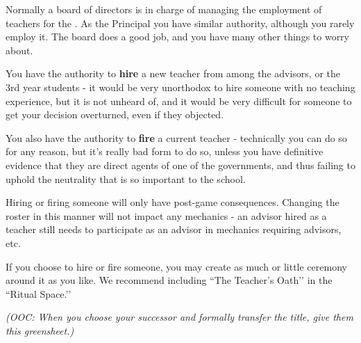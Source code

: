 \documentclass[green]{GL2020}
\begin{document}
\name{\gHireTeacher{}}

Normally a board of directors is in charge of managing the employment of teachers for the \pSchool{}. As the Principal you have similar authority, although you rarely employ it. The board does a good job, and you have many other things to worry about.

You have the authority to \textbf{hire} a new teacher from among the advisors, or the 3rd year students - it would be very unorthodox to hire someone with no teaching experience, but it is not unheard of, and it would be very difficult for someone to get your decision overturned, even if they objected.

You also have the authority to \textbf{fire} a current teacher - technically you can do so for any reason, but it’s really bad form to do so, unless you have definitive evidence that they are direct agents of one of the governments, and thus failing to uphold the neutrality that is so important to the school.

Hiring or firing someone will only have post-game consequences. Changing the roster in this manner will not impact any mechanics - an advisor hired as a teacher still needs to participate as an advisor in mechanics requiring advisors, etc.

If you choose to hire or fire someone, you may create as much or little ceremony around it as you like. We recommend including ``The Teacher’s Oath’’ in the ``Ritual Space.’’

\emph{(OOC: When you choose your successor and formally transfer the title, give them this greensheet.)}
\end{document}
